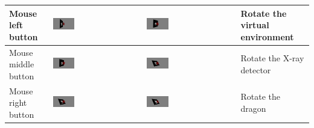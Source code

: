 \documentclass[10pt]{article}
\begin{document}
\begin{center}
\begin{longtable}{|m{}|m{}|m{}|m{}|}
		\hline
		Mouse left button	&	\includegraphics[width=0.25\textwidth]{mouse_click.png}	&	\includegraphics[width=0.25\textwidth]{mouse_left_click.png}	&	Rotate the virtual environment\\
		\hline
		Mouse middle button	&	\includegraphics[width=0.25\textwidth]{mouse_left_click.png}	&	\includegraphics[width=0.25\textwidth]{mouse_middle_click.png}	&	Rotate the X-ray detector\\
		\hline
		Mouse right button	&	\includegraphics[width=0.25\textwidth]{mouse_middle_click.png}	&	\includegraphics[width=0.25\textwidth]{mouse_right_click.png}	&	Rotate the dragon\\
		\hline
	\end{longtable}
\end{center}
\end{document}
